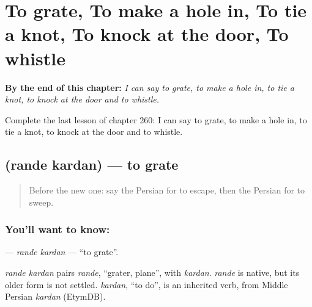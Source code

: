 
\chapter{To grate, To make a hole in, To tie a knot, To knock at the door, To whistle}
\label{ch:fa-to-grate-to-make-a-hole-in-to-tie-a-knot-to-knock-at-the-door-to-whistle}

\begin{chapteropening}
\textbf{By the end of this chapter:} \emph{I can say to grate, to make a hole in, to tie a knot, to knock at the door and to whistle.}

Complete the last lesson of chapter 260: I can say to grate, to make a hole in, to tie a knot, to knock at the door and to whistle.
\end{chapteropening}

\section[\texorpdfstring{\fa{رنده} \fa{کردن} (rande kardan)}{رنده کردن (rande kardan)}]{  (rande kardan) — to grate}

\label{lesson:FA-C260-rande-kardan}



\begin{quote}
Before the new one: say the Persian for to escape, then the Persian for to sweep.
\end{quote}

\subsection*{You'll want to know:  }
\textbf{ } — \emph{rande kardan} — \textquotedblleft{}to grate\textquotedblright{}.

\begin{cousinweb}
\emph{rande kardan} pairs \emph{rande}, \textquotedblleft{}grater, plane\textquotedblright{}, with \emph{kardan}. \emph{rande} is native, but its older form is not settled. \emph{kardan}, \textquotedblleft{}to do\textquotedblright{}, is an inherited verb, from Middle Persian \emph{kardan} (EtymDB).
\end{cousinweb}

